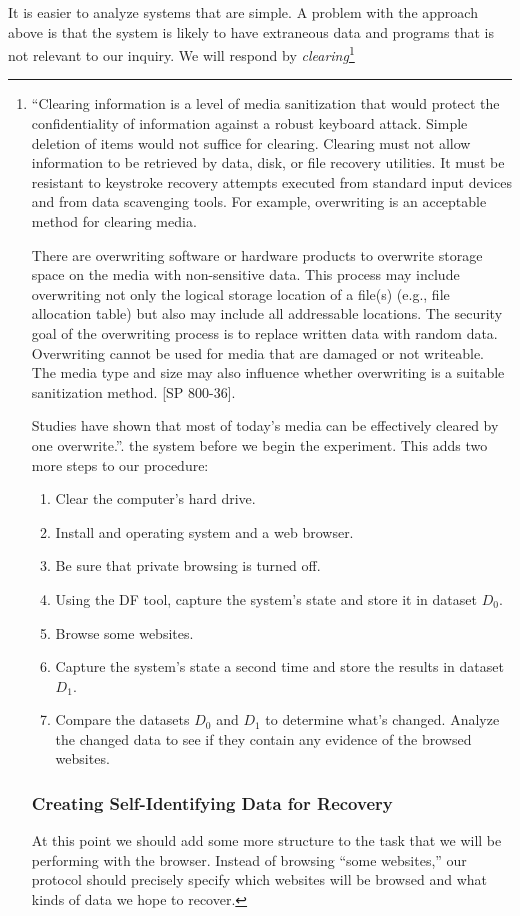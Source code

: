 It is easier to analyze systems that are simple. A problem with the
approach above is that the system is likely to have extraneous data and
programs that is not relevant to our inquiry. We will respond by
\emph{clearing}\footnote{``Clearing information is a level of media sanitization that would protect the confidentiality of information against a robust keyboard attack. Simple deletion of items would not suffice for 
clearing. Clearing must not allow information to be retrieved by data, disk, or file recovery 
utilities. It must be resistant to keystroke recovery attempts
executed from standard input devices and from data scavenging tools. For example, overwriting is an acceptable method 
for clearing media. 

There are overwriting software or hardware products to overwrite storage space on the 
media with non-sensitive data. This process may include overwriting not only the logical 
storage location of a file(s) (e.g., file allocation table) but also may include all addressable 
locations. The security goal of the overwriting process is to replace written data with 
random data. Overwriting cannot be used for media that are damaged or not writeable. 
The media type and size may also influence whether overwriting is a suitable sanitization 
method. [SP 800-36]. 

Studies have shown that most of today’s media can be effectively cleared by one overwrite.''\cite{nist-800-88}.
the system before we begin the
experiment. This adds two more steps to our procedure:

\begin{enumerate}
\item Clear the computer's hard drive.
\item Install and operating system and a web browser.
\item Be sure that private browsing is turned off.
\item Using the DF tool, capture the system's state and store it in dataset $D_0$.
\item Browse some websites.
\item Capture the system's state a second time and store the results in dataset $D_1$.
\item Compare the datasets $D_0$ and $D_1$ to determine what's
  changed. Analyze the changed data to see if they contain any
  evidence of the browsed websites. 
\end{enumerate}


\subsubsection{Creating Self-Identifying Data for Recovery}
At this point we should add some more structure to the task that we
will be performing with the browser. Instead of browsing ``some
websites,'' our protocol should precisely specify which websites will
be browsed and what kinds of data we hope to recover. 

}
